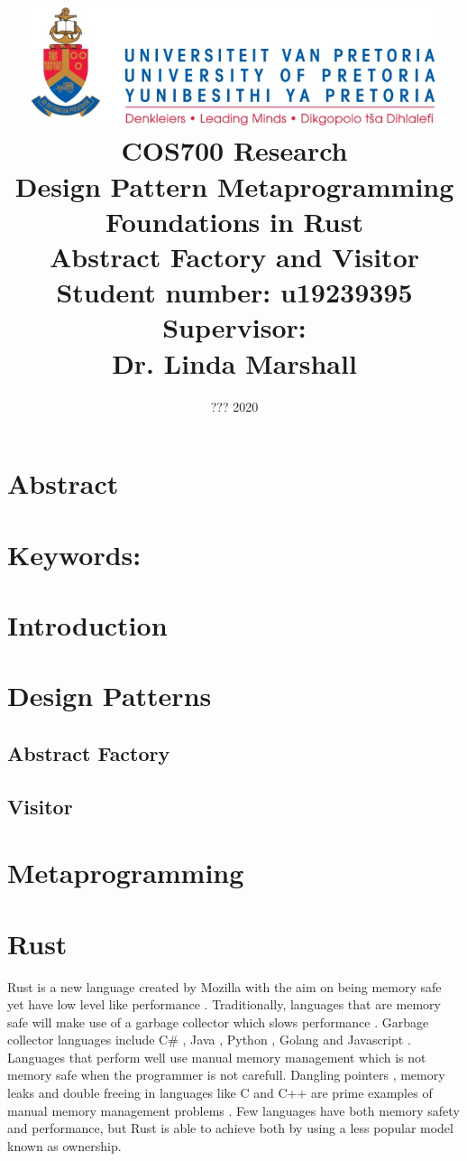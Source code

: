 \documentclass[a4paper,10pt]{article}
\title
{
   \includegraphics[width=12cm]{up_logo.png} \\
   \vspace{2cm}
   \textbf{COS700 Research} \\ \vspace{0.5cm}
   \textbf{Design Pattern Metaprogramming Foundations in Rust\\ \large Abstract Factory and Visitor} \\ \vspace{0.5cm}
   \textbf{Student number:} u19239395 \\ \vspace{0.5cm}
   \textbf{Supervisor}: \\ Dr. Linda Marshall
}
\date{??? 2020}
\begin{document}
\author{}

\maketitle

\newpage
\linespread{1.25}

\section*{Abstract}

\section*{Keywords:}

\newpage

\section{Introduction}

\section{Design Patterns}

\subsection{Abstract Factory}

\subsection{Visitor}

\section{Metaprogramming}

\section{Rust}
Rust is a new language created by Mozilla with the aim on being memory safe yet have low level like performance \cite{klabnik_2019_01}. Traditionally, languages that are memory safe will make use of a garbage collector which slows performance \cite{hertz_05_01}. Garbage collector languages include C\# \cite{robinson_04_01}, Java \cite{gosling_96_01}, Python \cite{martelli_06_01}, Golang \cite{tsoukalos_18_01} and Javascript \cite{flanagan_06_01}. Languages that perform well use manual memory management which is not memory safe when the programmer is not carefull. Dangling pointers \cite{caballero_12_01}, memory leaks \cite{wilson_92_01} and double freeing \cite{sharp_13_01} in languages like C and C++ are prime examples of manual memory management problems \cite{konrad_18_01}. Few languages have both memory safety and performance, but Rust is able to achieve both by using a less popular model known as ownership.
\end{document}
